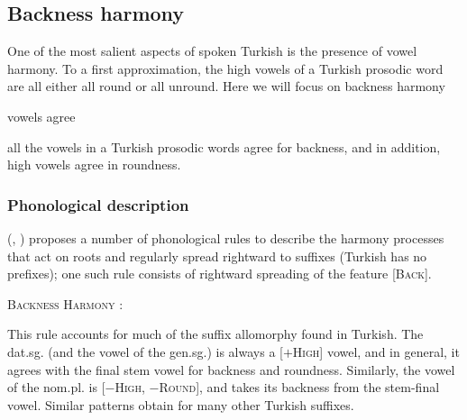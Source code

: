 \subsection{Backness harmony}

One of the most salient aspects of spoken Turkish is the presence of vowel harmony. To a first approximation, 
the high vowels of a Turkish prosodic word are all either all round or all unround. Here we will focus on backness harmony

vowels agree 

all the vowels in a Turkish prosodic words agree for backness, and in addition, high vowels agree in roundness.

\subsubsection{Phonological description}

\citeauthor{Lees1966a} (\citeyear[][284]{Lees1966b}, \citeyear[][35]{Lees1966a}) proposes a number of phonological rules to describe the harmony processes that act on roots and regularly spread rightward to suffixes (Turkish has no prefixes); one such rule consists of rightward spreading of the feature [\textsc{Back}].

\ex \textsc{Backness Harmony} \citep[e.g.,][229]{Clements1982}: \\
\xe


This rule accounts for much of the suffix allomorphy found in Turkish. The dat.sg. (and the vowel of the gen.sg.) is always a [$+$\textsc{High}] vowel, and in general, it agrees with the final stem vowel for backness and roundness. Similarly, the vowel of the nom.pl. is [$-$\textsc{High}, $-$\textsc{Round}], and takes its backness from the stem-final vowel. Similar patterns obtain for many other Turkish suffixes.

